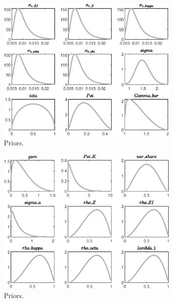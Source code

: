  
\begin{figure}[H]
\centering
\includegraphics[width=0.80\textwidth]{directed_search_est_alt_obs/graphs/directed_search_est_alt_obs_Priors1}
\caption{Priors.}\label{Fig:Priors:1}
\end{figure}
\begin{figure}[H]
\centering
\includegraphics[width=0.80\textwidth]{directed_search_est_alt_obs/graphs/directed_search_est_alt_obs_Priors2}
\caption{Priors.}\label{Fig:Priors:2}
\end{figure}
 
